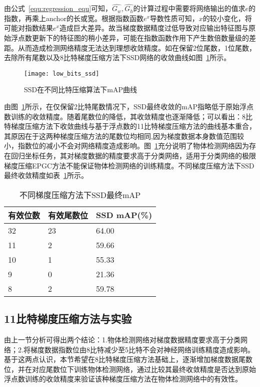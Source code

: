 由公式~\ref{equ:regression_equ}可知，$\hat{G_{w}}, \hat{G_{h}}$的计算过程中需要将网络输出的值求$e$的指数，再乘上anchor的长或宽。根据指数函数$e^{x}$导数性质可知，$x$的较小变化，将可能对指数结果$e^{x}$造成巨大差异。故当梯度数据精度过低导致对应输出特征图与原始浮点数更新下的特征图的稍小差异，可能在指数函数作用下产生数倍数量级的差距。从而造成检测网络精度无法达到理想收敛精度。如在保留2位尾数，1位尾数，去除所有尾数以及8比特梯度压缩方法下SSD网络的收敛曲线如图~\ref{fig:low_bits_ssd}所示。
\begin{figure}[htp]
\centering
\texttt{[image: low\_bits\_ssd]}
\caption{SSD在不同比特压缩算法下mAP曲线}
\label{fig:low_bits_ssd}
\end{figure}

由图~\ref{fig:low_bits_ssd}所示，在仅保留2比特尾数情况下，SSD最终收敛的mAP指略低于原始浮点数训练的收敛精度。随着尾数位的降低，其收敛精度也逐渐降低；可以看出：8比特梯度压缩方法下收敛曲线与基于浮点数的11比特梯度压缩方法的曲线基本重合，其原因在于这两种梯度压缩方法的尾数位均相同,因为梯度数据本身数值范围较小，指数位的减小不会对网络精度造成影响。图~\ref{fig:low_bits_ssd}充分说明了物体检测网络因为存在回归坐标任务，其对梯度数据的精度要求高于分类网络，适用于分类网络的极限梯度压缩EPGC方法不能保证物体检测网络的训练精度。不同梯度压缩方法下SSD最终收敛精度如表~\ref{tab:ssd_accs}所示。
\begin{table}[htb]
\centering
\noindent\begin{minipage}{0.6\textwidth}
\centering
\caption{不同梯度压缩方法下SSD最终mAP}
\label{tab:ssd_accs}
\begin{tabular}{p{2cm}p{2cm}p{2.5cm}}
\toprule[1.5pt]
有效位数 & 有效尾数位 & SSD mAP(\%) \\\midrule[1pt]
32 & 23 & 64.00 \\
11 & 2 & 59.66 \\
10 & 1 & 55.33 \\
9 & 0 & 21.36 \\
8 & 2 & 59.78 \\
\midrule[1pt]
\end{tabular}
\end{minipage}
\end{table}

\subsection{11比特梯度压缩方法与实验}
由上一节分析可得出两个结论：1.物体检测网络对梯度数据精度要求高于分类网络；2.将梯度数据指数位由8比特减少至5比特不会对神经网络训练精度造成影响。基于这两点认识，本节希望在8比特梯度压缩方法基础上，逐渐增加梯度数据尾数位，并在对应尾数位下训练物体检测网络，通过比较其最终收敛精度是否达到原始浮点数训练的收敛精度来验证该种梯度压缩方法在物体检测网络中的有效性。

